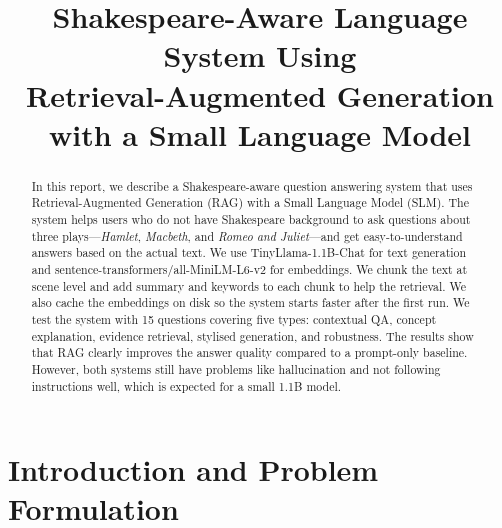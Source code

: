 \documentclass[10pt,conference]{IEEEtran}
\title{
Shakespeare-Aware Language System Using\\Retrieval-Augmented Generation with a Small Language Model
}
\author{
\IEEEauthorblockN{
Group Number: \emph{[Insert Group Number]}
}
\IEEEauthorblockA{
CSCI433/933 Machine Learning Algorithms and Applications\\
Student Names and Student Numbers: \emph{[Insert Details]}\\
}
}
\begin{document}
\maketitle

\begin{center}
\end{center}

\begin{abstract}
In this report, we describe a Shakespeare-aware question answering system that uses Retrieval-Augmented Generation (RAG) with a Small Language Model (SLM). The system helps users who do not have Shakespeare background to ask questions about three plays---\textit{Hamlet}, \textit{Macbeth}, and \textit{Romeo and Juliet}---and get easy-to-understand answers based on the actual text. We use TinyLlama-1.1B-Chat for text generation and sentence-transformers/all-MiniLM-L6-v2 for embeddings. We chunk the text at scene level and add summary and keywords to each chunk to help the retrieval. We also cache the embeddings on disk so the system starts faster after the first run. We test the system with 15 questions covering five types: contextual QA, concept explanation, evidence retrieval, stylised generation, and robustness. The results show that RAG clearly improves the answer quality compared to a prompt-only baseline. However, both systems still have problems like hallucination and not following instructions well, which is expected for a small 1.1B model.
\end{abstract}

\section{Introduction and Problem Formulation}
\label{sec:introduction}
\end{document}
